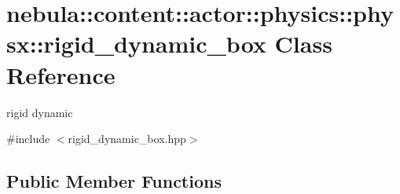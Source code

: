 \hypertarget{classnebula_1_1content_1_1actor_1_1physics_1_1physx_1_1rigid__dynamic__box}{
\section{nebula::content::actor::physics::physx::rigid\_\-dynamic\_\-box Class Reference}
\label{classnebula_1_1content_1_1actor_1_1physics_1_1physx_1_1rigid__dynamic__box}
}


rigid dynamic  


{\ttfamily \#include $<$rigid\_\-dynamic\_\-box.hpp$>$}\subsection*{Public Member Functions}
